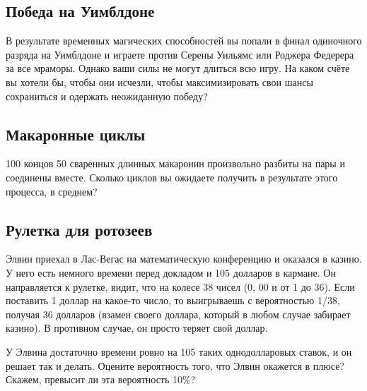\subsection*{Победа на Уимблдоне}

В результате временных магических способностей вы попали в финал одиночного разряда на Уимблдоне и играете против Серены Уильямс или Роджера Федерера за все мраморы. Однако ваши силы не могут длиться всю игру. На каком счёте вы хотели бы, чтобы они исчезли, чтобы максимизировать свои шансы сохраниться и одержать неожиданную победу?

\subsection*{Макаронные циклы}

100 концов 50 сваренных длинных макаронин произвольно разбиты на пары и соединены вместе.
Сколько циклов вы ожидаете получить в результате этого процесса, в среднем?

\subsection*{Рулетка для ротозеев}

Элвин приехал в Лас-Вегас на математическую конференцию и оказался в казино.
У него есть немного времени перед докладом и 105 долларов в кармане.
Он направляется к рулетке, видит, что на колесе 38 чисел (0, 00 и от 1 до 36).
Если поставить 1 доллар на какое-то число, то выигрываешь с вероятностью 1/38, получая 36 долларов (взамен своего доллара, который в любом случае забирает казино).
В противном случае, он просто теряет свой доллар.

У Элвина достаточно времени ровно на 105 таких однодолларовых ставок, и он решает так и делать.
Оцените вероятность того, что Элвин окажется в плюсе?
Скажем, превысит ли эта вероятность 10\%?
